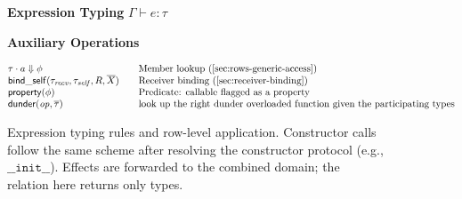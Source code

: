 \begin{figure}[t]
\centering
\begin{minipage}{\linewidth}
\small
\textbf{Expression Typing } \(\Gamma \vdash e : \tau\)

\medskip
{}

\medskip
\textbf{Auxiliary Operations}

\[
\begin{array}{@{}l@{\qquad}l@{}}
\tau \cdot a \Downarrow \phi & \text{Member lookup (\Cref{sec:rows-generic-access})} \\
\mathsf{bind\_self}(\tau_{\mathit{recv}}, \tau_{\mathit{self}}, R, \overline{X})
  & \text{Receiver binding (\Cref{sec:receiver-binding})} \\
\mathsf{property}(\phi)
  & \text{Predicate: callable flagged as a property} \\ 
\mathsf{dunder}(\mathit{op},\overline{\tau})
  & \text{look up the right dunder overloaded function given the participating types}
\end{array}
\]
\end{minipage}
\caption{Expression typing rules and row-level application. Constructor calls follow the same scheme after resolving the constructor protocol (e.g., \(\mathtt{\_\_init\_\_}\)). Effects are forwarded to the combined domain; the relation here returns only types.}
\label{fig:typing-rules}
\end{figure}

